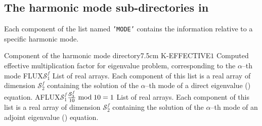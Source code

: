\subsection{The harmonic mode sub-directories in }\label{sect:mode_spec}

Each component of the list named {\tt 'MODE'} contains the information relative to a specific
harmonic mode.

\begin{DescriptionEnregistrement}{Component of the harmonic mode directory}{7.5cm}
\RealEnr
  {K-EFFECTIVE}{$1$}{}
  {Computed effective multiplication factor for eigenvalue problem,
  corresponding to the $\alpha$--th mode}
\DirlEnr
  {FLUX}{$\mathcal{S}^{f}_{1}$}
  {List of real arrays. Each component of this list is a real array of dimension $\mathcal{S}^{f}_{2}$
  containing the solution of the $\alpha$--th mode of a direct eigenvalue () equation.}
\OptDirlEnr
  {AFLUX}{$\mathcal{S}^{f}_{1}$}{${\mathcal{S}^{f}_{3}\over 10} \bmod 10 = 1$}
  {List of real arrays. Each component of this list is a real array of dimension $\mathcal{S}^{f}_{2}$
  containing the solution of the $\alpha$--th mode of an adjoint eigenvalue () equation.}
\end{DescriptionEnregistrement}

\eject
